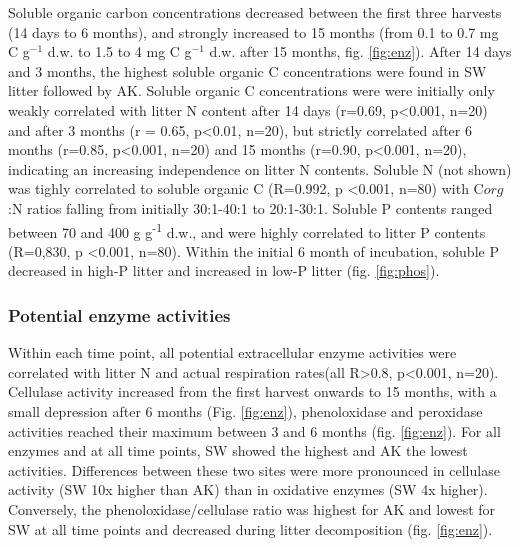 Soluble organic carbon concentrations decreased between the first three harvests (14 days to 6 months), and strongly increased to 15 months (from 0.1 to 0.7 mg C g$^{-1}$  d.w. to 1.5 to 4 mg C g$^{-1}$ d.w. after 15 months, fig. \ref{fig:enz}). After 14 days and 3 months, the highest soluble organic C concentrations were found in SW litter followed by AK. Soluble organic C concentrations were were initially only weakly correlated with litter N content after 14 days (r=0.69, p\textless 0.001, n=20) and after 3 months (r = 0.65, p\textless 0.01, n=20), but strictly correlated after 6 months (r=0.85, p\textless 0.001, n=20) and 15 months (r=0.90, p\textless 0.001, n=20), indicating an increasing independence on litter N contents. Soluble N (not shown) was tighly correlated to soluble organic C (R=0.992, p \textless 0.001, n=80) with C${org}$:N ratios falling from initially 30:1-40:1 to 20:1-30:1. Soluble P contents ranged between 70 and 400 \textmu g g\textsuperscript{-1} d.w., and were highly correlated to litter P contents (R=0,830, p \textless 0.001, n=80). Within the initial 6 month of incubation, soluble P decreased in high-P litter and increased in low-P litter (fig. \ref{fig:phos}).

\subsubsection*{Potential enzyme activities}
Within each time point, all potential extracellular enzyme activities were correlated with litter N and actual respiration rates(all R\textgreater 0.8, p\textless 0.001, n=20). Cellulase activity increased from the first harvest onwards to 15 months, with a small depression after 6 months (Fig. \ref{fig:enz}), phenoloxidase and peroxidase activities reached their maximum between 3 and 6 months (fig. \ref{fig:enz}). For all enzymes and at all time points, SW showed the highest and AK the lowest activities. Differences between these two sites were more pronounced in cellulase activity (SW 10x higher than AK) than in oxidative enzymes (SW 4x higher). Conversely, the phenoloxidase/cellulase ratio was highest for AK and lowest for SW at all time points and decreased during litter decomposition (fig. \ref{fig:enz}).

